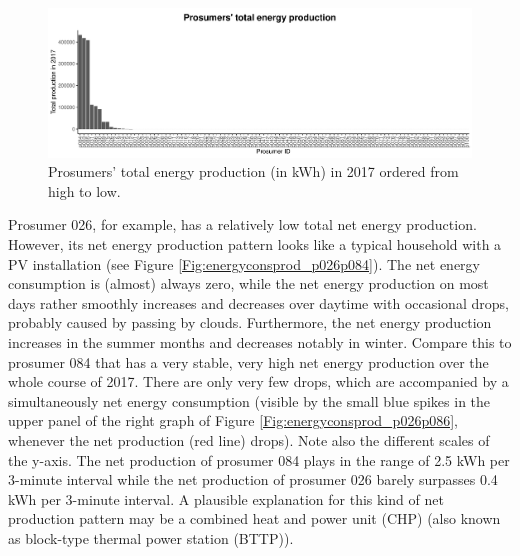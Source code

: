 \begin{figure}[htbp]
 \centering
\includegraphics[width=\textwidth]{thesis/graphs/prosumer_totalproduction2.pdf}
\caption[Prosumers’ total energy production (in kWh) in 2017 ordered from high to low]{Prosumers’ total energy production (in kWh) in 2017 ordered from high to low. \quantnet}
\label{Fig:pros_total_production}
\end{figure}

Prosumer 026, for example, has a relatively low total net energy production. However, its net energy production pattern looks like a typical household with a PV installation (see Figure \ref{Fig:energyconsprod_p026p084}). The net energy consumption is (almost) always zero, while the net energy production on most days rather smoothly increases and decreases over daytime with occasional drops, probably caused by passing by clouds. Furthermore, the net energy production increases in the summer months and decreases notably in winter. Compare this to prosumer 084 that has a very stable, very high net energy production over the whole course of 2017. There are only very few drops, which are accompanied by a simultaneously net energy consumption (visible by the small blue spikes in the upper panel of the right graph of Figure \ref{Fig:energyconsprod_p026p086}, whenever the net production (red line) drops). Note also the different scales of the y-axis. The net production of prosumer 084 plays in the range of 2.5 kWh per 3-minute interval while the net production of prosumer 026 barely surpasses 0.4 kWh per 3-minute interval. A plausible explanation for this kind of net production pattern may be a combined heat and power unit (CHP) (also known as block-type thermal power station (BTTP)). 

